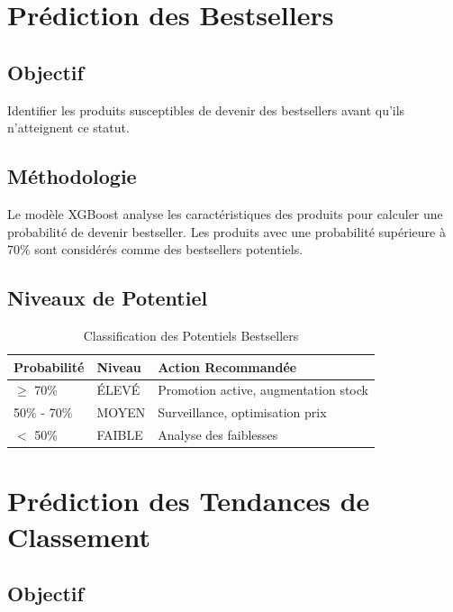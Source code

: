 \documentclass[12pt,a4paper]{report}
\begin{document}
\section{Prédiction des Bestsellers}

\subsection{Objectif}

Identifier les produits susceptibles de devenir des bestsellers avant qu'ils n'atteignent ce statut.

\subsection{Méthodologie}

Le modèle XGBoost analyse les caractéristiques des produits pour calculer une probabilité de devenir bestseller. Les produits avec une probabilité supérieure à 70\% sont considérés comme des bestsellers potentiels.

\subsection{Niveaux de Potentiel}

\begin{table}[H]
    \centering
    \caption{Classification des Potentiels Bestsellers}
    \begin{tabular}{llp{8cm}}
        \toprule
        \textbf{Probabilité} & \textbf{Niveau} & \textbf{Action Recommandée} \\
        \midrule
        $\geq$ 70\% & ÉLEVÉ & Promotion active, augmentation stock \\
        50\% - 70\% & MOYEN & Surveillance, optimisation prix \\
        $<$ 50\% & FAIBLE & Analyse des faiblesses \\
        \bottomrule
    \end{tabular}
    \label{tab:bestseller_levels}
\end{table}

\section{Prédiction des Tendances de Classement}

\subsection{Objectif}
\end{document}
